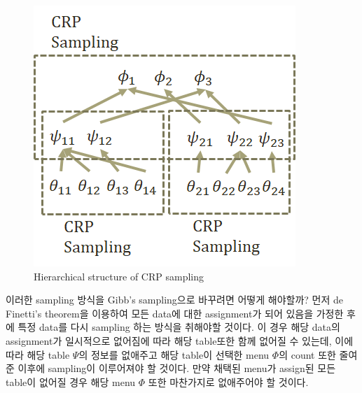 \documentclass[a4paper]{oblivoir}
\begin{document}
\begin{figure}[ht] \centering 
\begin{center}
\includegraphics[scale=0.5]{fig13_17.png} 
\caption{Hierarchical structure of CRP sampling}
\label{fig:13-19}
\end{center}
\end{figure}

이러한 sampling 방식을 Gibb's sampling으로 바꾸려면 어떻게 해야할까? 먼저 de Finetti's theorem을 이용하여 모든 data에 대한 assignment가 되어 있음을 가정한 후에 특정 data를 다시 sampling 하는 방식을 취해야할 것이다. 이 경우 해당 data의 assignment가 일시적으로 없어짐에 따라 해당 table또한 함께 없어질 수 있는데, 이에 따라 해당 table $\Psi$의 정보를 없애주고 해당 table이 선택한 menu $\Phi$의 count 또한 줄여준 이후에 sampling이 이루어져야 할 것이다. 만약 채택된 menu가 assign된 모든 table이 없어질 경우 해당 menu $\Phi$ 또한 마찬가지로 없애주어야 할 것이다. 
\end{document}
